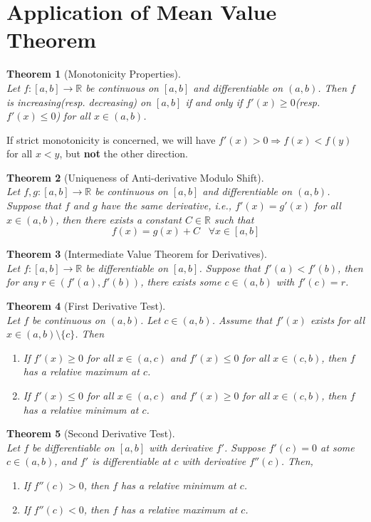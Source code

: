 \documentclass[12pt]{article}
\newtheorem{theorem}{Theorem}[section]
\theoremstyle{definition}
\begin{document}
\section{Application of Mean Value Theorem}
\begin{theorem}[Monotonicity Properties]
\hfill\\\normalfont Let $f:[a,b]\to\mathbb{R}$ be continuous on $[a,b]$ and differentiable on $(a,b)$. Then $f$ is increasing(resp. decreasing) on $[a,b]$ if and only if $f'(x)\geq 0$(resp. $f'(x)\leq 0$) for all $x\in(a,b)$.
\end{theorem}
If strict monotonicity is concerned, we will have $f'(x)>0\Rightarrow f(x)<f(y)$ for all $x<y$, but \textbf{not} the other direction.
\begin{theorem}[Uniqueness of Anti-derivative Modulo Shift]
\hfill\\\normalfont Let $f,g:[a,b]\to\mathbb{R}$ be continuous on $[a,b]$ and differentiable on $(a,b)$.\\Suppose that $f$ and $g$ have the same derivative, i.e., $f'(x)=g'(x)$ for all $x\in(a,b)$, then there exists a constant $C\in\mathbb{R}$ such that
\[
f(x) = g(x)+C\;\;\;\forall x\in[a,b]
\]
\end{theorem}
\begin{theorem}[Intermediate Value Theorem for Derivatives]
\hfill\\\normalfont Let $f:[a,b]\to\mathbb{R}$ be differentiable on $[a,b]$. Suppose that $f'(a)<f'(b)$, then for any $r\in(f'(a),f'(b))$, there exists some $c\in(a,b)$ with $f'(c)=r$.
\end{theorem}
\begin{theorem}[First Derivative Test]
\hfill\\\normalfont Let $f$ be continuous on $(a,b)$. Let $c\in(a,b)$. Assume that $f'(x)$ exists for all $x\in(a,b)\setminus\{c\}$. Then
\begin{enumerate}
	\item If $f'(x)\geq 0$ for all $x\in(a,c)$ and $f'(x)\leq 0$ for all $x\in(c,b)$, then $f$ has a relative maximum at $c$.
	\item If $f'(x)\leq 0$ for all $x\in(a,c)$ and $f'(x)\geq 0$ for all $x\in(c,b)$, then $f$ has a relative minimum at $c$.
\end{enumerate}
\end{theorem}
\begin{theorem}[Second Derivative Test]
\hfill\\\normalfont Let $f$ be differentiable on $[a,b]$ with derivative $f'$. Suppose $f'(c)=0$ at some $c\in(a,b)$, and $f'$ is differentiable at $c$ with derivative $f''(c)$. Then,
\begin{enumerate}
	\item If $f''(c)>0$, then $f$ has a relative minimum at $c$.
	\item If $f''(c)<0$, then $f$ has a relative maximum at $c$.
\end{enumerate}
\end{theorem}
\end{document}
